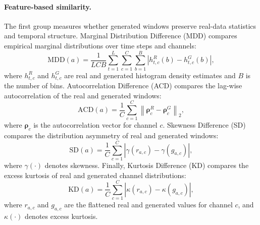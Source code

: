 \paragraph{Feature-based similarity.}
The first group measures whether generated windows preserve real-data
statistics and temporal structure. Marginal Distribution Difference (MDD)
compares empirical marginal distributions over time steps and channels:
\begin{equation}
    \mathrm{MDD}(a)=
    \frac{1}{LCB}
    \sum_{t=1}^{L}\sum_{c=1}^{C}\sum_{b=1}^{B}
    \left|h_{t,c}^{R}(b)-h_{t,c}^{G}(b)\right| ,
\end{equation}
where $h_{t,c}^{R}$ and $h_{t,c}^{G}$ are real and generated histogram density
estimates and $B$ is the number of bins.
Autocorrelation Difference (ACD) compares the lag-wise autocorrelation of the
real and generated windows:
\begin{equation}
    \mathrm{ACD}(a)=
    \frac{1}{C}
    \sum_{c=1}^{C}
    \left\|\boldsymbol{\rho}_{c}^{R}
    -\boldsymbol{\rho}_{c}^{G}\right\|_2 ,
\end{equation}
where $\boldsymbol{\rho}_{c}$ is the autocorrelation vector for channel $c$.
Skewness Difference (SD) compares the distribution asymmetry of real
and generated windows:
\begin{equation}
    \mathrm{SD}(a)=
    \frac{1}{C}
    \sum_{c=1}^{C}
    \left|
    \gamma(r_{a,c})-\gamma(g_{a,c})
    \right| ,
\end{equation}
where $\gamma(\cdot)$ denotes skewness. Finally, Kurtosis Difference (KD)
compares the excess kurtosis of real and generated channel distributions:
\begin{equation}
    \mathrm{KD}(a)=
    \frac{1}{C}
    \sum_{c=1}^{C}
    \left|
    \kappa(r_{a,c})-\kappa(g_{a,c})
    \right| ,
\end{equation}
where $r_{a,c}$ and $g_{a,c}$ are the flattened real and generated values for
channel $c$, and $\kappa(\cdot)$ denotes excess kurtosis.

